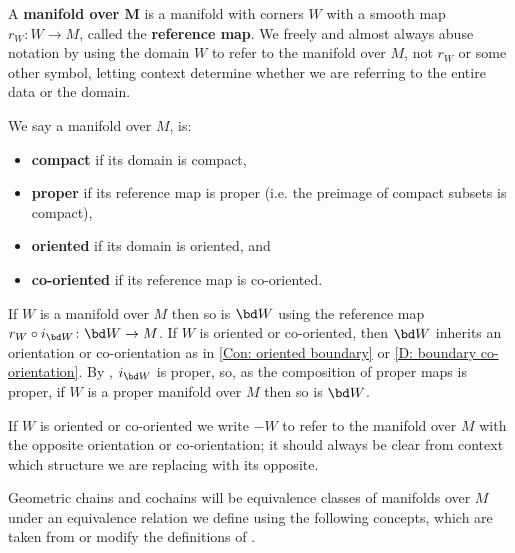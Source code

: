 \begin{definition}\label{V: maps are co-oriented}
	A \textbf{manifold over $\mathbf{M}$} is a manifold with corners $W$ with a smooth map $r_W \colon W \to M$,
	called the \textbf{reference map}.
	We freely and almost always abuse notation
	by using the domain $W$ to refer to the manifold over $M$, not $r_W$ or some other symbol, letting
	context determine whether we are referring to the entire data or the domain.

	We say a manifold over $M$, is:
	\begin{itemize}
		\item \textbf{compact} if its domain is compact,
		\item \textbf{proper} if its reference map is proper (i.e. the preimage of compact subsets is compact),
		\item \textbf{oriented} if its domain is oriented, and
		\item \textbf{co-oriented} if its reference map is co-oriented.
	\end{itemize}
	If $W$ is a manifold over $M$ then so is $\bd W$ using the reference map $r_W \circ i_{\bd W} \colon \bd W \to M$.
	If $W$ is oriented or co-oriented, then $\bd W$ inherits an orientation or co-orientation as in \cref{Con: oriented boundary} or \cref{D: boundary co-orientation}.
	By \cite[Lemma 2.8]{Joy12}, $i_{\bd W}$ is proper, so, as the composition of proper maps is proper, if $W$ is a proper manifold over $M$ then so is $\bd W$.

	If $W$ is oriented or co-oriented we write $-W$ to refer to the manifold over $M$ with the opposite orientation or co-orientation; it should always be clear from context which structure we are replacing with its opposite.
\end{definition}


Geometric chains and cochains will be equivalence classes of manifolds over $M$ under an equivalence relation we define using the following concepts, which are taken from or modify
the definitions of \cite{Lipy14}.

